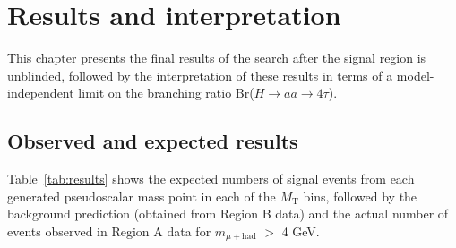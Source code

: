 \chapter{Results and interpretation\label{sec:results}}

This chapter presents the final results of the search after the signal region is unblinded, followed by the interpretation of these results in terms of a model-independent limit on the branching ratio Br($H\rightarrow$$aa$$\rightarrow4\tau$).

\section{Observed and expected results\label{sec:results-obsexp}}

Table~\ref{tab:results} shows the expected numbers of signal events from each generated pseudoscalar mass point in each of the $M_{\text{T}}$ bins, followed by the background prediction (obtained from Region B data) and the actual number of events observed in Region A data for $m_{\mu+\text{had}}$ $>$ 4 GeV.

